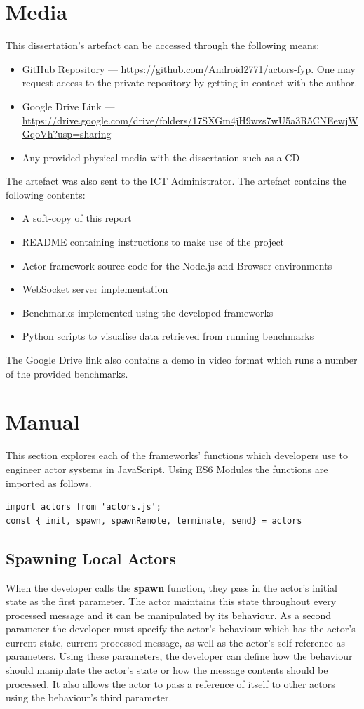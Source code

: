 \documentclass[oneside]{um-fict}
\begin{document}
\appendix
\chapter{Media}\label{appendix:media}
This dissertation's artefact can be accessed through the following means:
\begin{itemize}
\item GitHub Repository --- \url{https://github.com/Android2771/actors-fyp}. One may request access to the private repository by getting in contact with the author.
\item Google Drive Link --- \url{https://drive.google.com/drive/folders/17SXGm4jH9wzs7wU5a3R5CNEewjWGqoVh?usp=sharing}
\item Any provided physical media with the dissertation such as a CD
\end{itemize}

The artefact was also sent to the ICT Administrator. The artefact contains the following contents:
\begin{itemize}
\item A soft-copy of this report
\item README containing instructions to make use of the project
\item Actor framework source code for the Node.js and Browser environments
\item WebSocket server implementation
\item Benchmarks implemented using the developed frameworks
\item Python scripts to visualise data retrieved from running benchmarks
\end{itemize}

The Google Drive link also contains a demo in video format which runs a number of the provided benchmarks.
\chapter{Manual}\label{appendix:manual}
This section explores each of the frameworks' functions which developers use to engineer actor systems in JavaScript. Using ES6 Modules the functions are imported as follows.
\begin{lstlisting}
import actors from 'actors.js';
const { init, spawn, spawnRemote, terminate, send} = actors
\end{lstlisting}
\section{Spawning Local Actors}
When the developer calls the \textbf{spawn} function, they pass in the actor's initial state as the first parameter. The actor maintains this state throughout every processed message and it can be manipulated by its behaviour. As a second parameter the developer must specify the actor's behaviour which has the actor's current state, current processed message, as well as the actor's self reference as parameters. Using these parameters, the developer can define how the behaviour should manipulate the actor's state or how the message contents should be processed. It also allows the actor to pass a reference of itself to other actors using the behaviour's third parameter.
\end{document}
